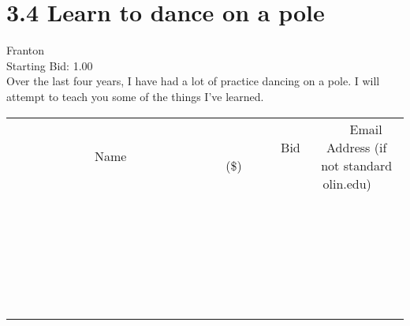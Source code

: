 \documentclass[11pt]{article}
\begin{document}
					\section*{3.4 Learn to dance on a pole}
					Franton \\
					Starting Bid: 1.00 \\
					Over the last four years, I have had a lot of practice dancing on a pole. I will attempt to teach you some of the things I've learned. \\
					[6ex]
					\begin{tabular}{c c c}
						~~~~~~~~~~~~~Name~~~~~~~~~~~~~ & ~~~~~~~~~Bid (\$)~~~~~~~~~ & ~~~Email Address (if not standard olin.edu)~~~ \\
				
 & & \\
\hline
 & & \\
\hline
 & & \\
\hline
 & & \\
\hline
 & & \\
\hline
 & & \\
\hline
 & & \\
\hline
 & & \\
\hline
 & & \\
\hline
 & & \\
\hline
 & & \\
\hline
 & & \\
\hline
 & & \\
\hline
 & & \\
\hline
 & & \\
\hline
 & & \\
\hline
 & & \\
\hline
 & & \\
\hline
 & & \\
\hline
 & & \\
\hline
 & & \\
\hline
 & & \\
\hline
 & & \\
\hline
 & & \\
\hline
 & & \\
\hline
 & & \\
\hline
					\end{tabular}
					\clearpage
				
\end{document}
